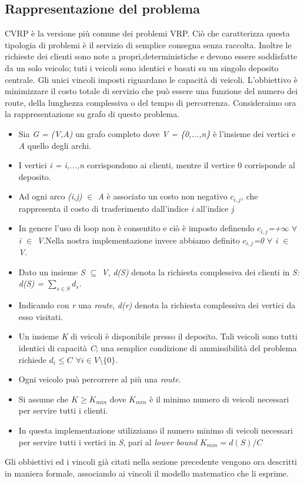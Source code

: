 \documentclass[]{article}
\begin{document}
\newpage
\subsection{Rappresentazione del problema} \label{RappProb-sec}
CVRP è la versione più comune dei problemi VRP. Ciò che caratterizza questa tipologia di problemi è il servizio di semplice consegna senza raccolta.
Inoltre le richieste dei clienti sono note a propri,deterministiche e devono essere soddisfatte da un solo veicolo; tuti i veicoli sono identici e basati su un singolo deposito centrale. Gli unici vincoli imposti riguardano le capacità di veicoli. L'obbiettivo è minimizzare il costo totale di servizio che può essere una funzione del numero dei route, della lunghezza complessiva o del tempo di percorrenza.
Consideraimo ora la rappresentazione su grafo di questo problema.
\begin{itemize}
\item Sia \emph{G = (V,A)} un grafo completo dove \emph{V = \{0,...,n\}} è l'insieme dei vertici e \emph{A} quello degli archi.
\item I vertici \emph{i = i,...,n} corrispondono ai clienti, mentre il vertice 0 corrisponde al deposito. 
\item Ad ogni arco \emph{(i,j) $\in$ A} è associato un costo non negativo \emph{$c_{i,j}$}, che rappresenta il costo di trasferimento dall'indice \emph{i} all'indice \emph{j}
\item In genere l'uso di loop non è consentito e ciò è imposto definendo \emph{$c_{i,j}$=+$\infty$}  \emph{ $\forall$ i $\in$ V}.Nella nostra implementazione invece abbiamo definito  \emph{$c_{i,j}$=0}  \emph{ $\forall$ i $\in$ V}.
\item Dato un insieme \emph{ S $\subseteq$ V}, \emph{d(S)} denota la richiesta complessiva dei clienti in \emph{S: d(S) = $\sum_{s \in S} d_{s} $}.
\item  Indicando con \emph{r} una \emph{route}, \emph{d(r)} denota la richiesta complessiva dei vertici da esso visitati.
\item Un insieme \emph{K} di veicoli è disponibile presso il deposito. Tali veicoli sono tutti identici di capacità \emph{C}; una semplice condizione di ammissibilità del problema richiede \emph{$ d_{i} \leq C $ $ \forall i \in V \setminus \{0\} $}.
\item Ogni veicolo può percorrere al più una \emph{route}.
\item Si assume che \emph{$K \geq K_{min}$} dove \emph{$K_{min}$} è il minimo numero di veicoli necessari per servire tutti i clienti.
\item In questa implementazione utilizziamo il numero minimo di veicoli necessari per servire tutti i vertici in \emph{S}, pari al  \emph{lower bound}  \emph{$ K_{min} =d(S)/C $}
\end{itemize}
Gli obbiettivi ed i vincoli già citati nella sezione precedente vengono ora descritti in maniera formale, associando ai vincoli il modello matematico che li esprime.
\end{document}

